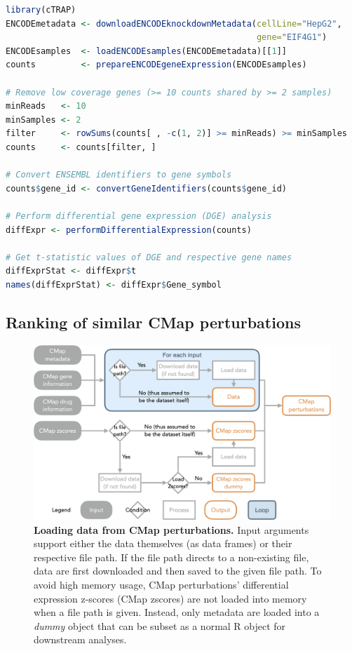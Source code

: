 \begin{lstlisting}[caption=Code to obtain example dataset \texttt{diffExprStat}.,language=R,label={lst:diffExprStat}]
library(cTRAP)
ENCODEmetadata <- downloadENCODEknockdownMetadata(cellLine="HepG2",
                                                  gene="EIF4G1")
ENCODEsamples  <- loadENCODEsamples(ENCODEmetadata)[[1]]
counts         <- prepareENCODEgeneExpression(ENCODEsamples)

# Remove low coverage genes (>= 10 counts shared by >= 2 samples)
minReads   <- 10
minSamples <- 2
filter     <- rowSums(counts[ , -c(1, 2)] >= minReads) >= minSamples
counts     <- counts[filter, ]

# Convert ENSEMBL identifiers to gene symbols
counts$gene_id <- convertGeneIdentifiers(counts$gene_id)

# Perform differential gene expression (DGE) analysis
diffExpr <- performDifferentialExpression(counts)

# Get t-statistic values of DGE and respective gene names
diffExprStat <- diffExpr$t
names(diffExprStat) <- diffExpr$Gene_symbol
\end{lstlisting}

\subsection{Ranking of similar CMap perturbations}

\begin{figure}[!b]
  \includegraphics[width=.8\textwidth]{images/ctrap/cmap-perturbations}
  \centering
  \caption[Loading data from CMap perturbations]{\textbf{Loading data from CMap perturbations.} Input arguments support either the data themselves (as data frames) or their respective file path. If the file path directs to a non-existing file,  data are first downloaded and then saved to the given file path. To avoid high memory usage, CMap perturbations' differential expression z-scores (CMap zscores) are not loaded into memory when a file path is given. Instead, only metadata are loaded into a \emph{dummy} object that can be subset as a normal R object for downstream analyses.}
  \label{fig:ctrap-cmap-perturbations}
\end{figure}

